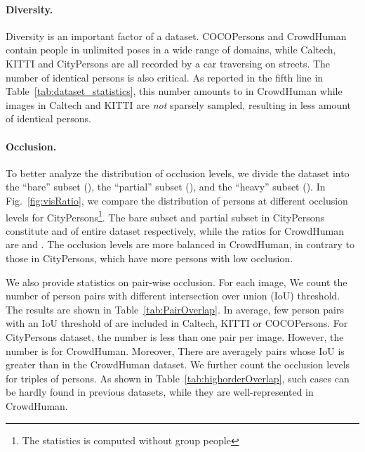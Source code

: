 \documentclass[10pt,twocolumn,letterpaper]{article}
\begin{document}
\paragraph{Diversity.}
Diversity is an important factor of a dataset. COCOPersons and CrowdHuman contain people in unlimited poses in a wide range of domains, while Caltech, KITTI and CityPersons are all recorded by a car traversing on streets. 
The number of identical persons is also critical. As reported in the fifth line in Table~\ref{tab:dataset_statistics}, this number amounts to  in CrowdHuman while images in Caltech and KITTI are \emph{not} sparsely sampled, resulting in less amount of identical persons.

\paragraph{Occlusion.}
To better analyze the distribution of occlusion levels, we divide the dataset into the ``bare'' subset (), the ``partial'' subset (), and the ``heavy'' subset (). In Fig.~\ref{fig:visRatio}, we compare the distribution of persons at different occlusion levels for CityPersons\footnote{The statistics is computed without group people}. The bare subset and partial subset in CityPersons constitute  and  of entire dataset respectively, while the ratios for CrowdHuman are  and . The occlusion levels are more balanced in CrowdHuman, in contrary to those in CityPersons, which have more persons with low occlusion.

We also provide statistics on pair-wise occlusion. For each image, We count the number of person pairs with different intersection over union (IoU) threshold. The results are shown in Table~\ref{tab:PairOverlap}. In average, few person pairs with an IoU threshold of  are included in Caltech, KITTI or COCOPersons. For CityPersons dataset, the number is less than one pair per image. However, the number is  for CrowdHuman. Moreover, There are averagely  pairs whose IoU is greater than  in the CrowdHuman dataset. We further count the occlusion levels for triples of persons. As shown in Table~\ref{tab:highorderOverlap}, such cases can be hardly found in previous datasets, while they are well-represented in CrowdHuman.
\end{document}
